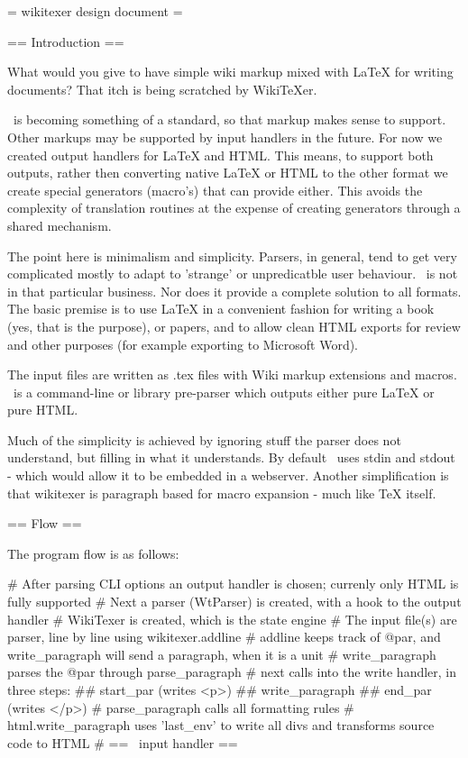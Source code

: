 = wikitexer design document =

== Introduction ==


What would you give to have simple wiki markup mixed with LaTeX for
writing documents? That itch is being scratched by WikiTeXer.

\mediawiki\ is becoming something of a standard, so that markup makes
sense to support. Other markups may be supported by input handlers in
the future. For now we created output handlers for LaTeX and HTML.
This means, to support both outputs, rather then converting native
LaTeX or HTML to the other format we create special generators
(macro's) that can provide either. This avoids the complexity of
translation routines at the expense of creating generators through a
shared mechanism.

The point here is minimalism and simplicity. Parsers, in general, tend
to get very complicated mostly to adapt to 'strange' or unpredicatble
user behaviour. \wikitexer\ is not in that particular business. Nor
does it provide a complete solution to all formats. The basic premise
is to use LaTeX in a convenient fashion for writing a book (yes, that
is the purpose), or papers, and to allow clean HTML exports for review
and other purposes (for example exporting to Microsoft Word).

The input files are written as .tex files with Wiki markup extensions
and macros. \wikitexer\ is a command-line or library pre-parser which
outputs either pure LaTeX or pure HTML.

Much of the simplicity is achieved by ignoring stuff the parser does
not understand, but filling in what it understands. By default
\wikitexer\ uses stdin and stdout - which would allow it to be
embedded in a webserver. Another simplification is that wikitexer is 
paragraph based for macro expansion - much like TeX itself.

== Flow ==

The program flow is as follows:

# After parsing CLI options an output handler is chosen; currenly only HTML is fully supported
# Next a parser (WtParser) is created, with a hook to the output handler
# WikiTexer is created, which is the state engine
# The input file(s) are parser, line by line using wikitexer.addline
# addline keeps track of @par, and write\_paragraph will send a paragraph, when it is a unit
# write\_paragraph parses the @par through parse\_paragraph
# next calls into the write handler, in three steps:
## start\_par (writes <p>)
## write\_paragraph
## end\_par (writes </p>)
# parse\_paragraph calls all formatting rules
# html.write\_paragraph uses 'last\_env' to write all divs and transforms source code to HTML
#
== \mediawiki\ input handler ==

